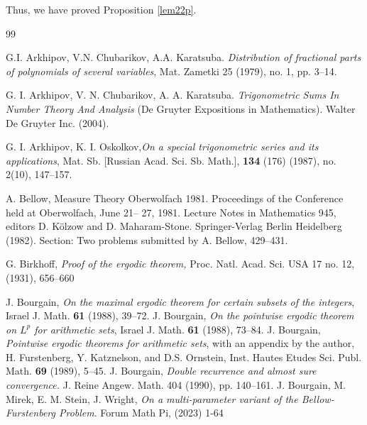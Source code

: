 \documentclass[11 pt,letterpaper]{amsart}
\theoremstyle{plain}
\theoremstyle{definition}
\theoremstyle{remark} \theoremstyle{exam} \theoremstyle{ob}
\numberwithin{equation}{section}
\begin{document}
Thus, we have proved   Proposition \ref{lem22p}.








 



 



 


 \begin{thebibliography}{99}


 G.I. Arkhipov, V.N. Chubarikov, A.A. Karatsuba. \emph{Distribution of fractional parts of polynomials of
several variables},  Mat. Zametki 25 (1979), no. 1, pp. 3–14.

 G. I. Arkhipov, V. N. Chubarikov, A. A. Karatsuba. \emph{Trigonometric Sums In Number Theory And
Analysis} (De Gruyter Expositions in Mathematics). Walter De Gruyter Inc. (2004).

  G. I. Arkhipov, K. I. Oskolkov,\emph{On a special trigonometric series and its applications},  Mat. Sb.
[Russian Acad. Sci. Sb. Math.], \textbf{134} (176) (1987), no. 2(10), 147–157.

	 A. Bellow, Measure Theory Oberwolfach 1981. Proceedings of the Conference held at Oberwolfach, June 21–
27, 1981. Lecture Notes in Mathematics 945, editors D. Kölzow and D. Maharam-Stone. Springer-Verlag Berlin
Heidelberg (1982). Section: Two problems submitted by A. Bellow, 429–431.



 

 G. Birkhoff, \emph{ Proof of the ergodic theorem,} Proc. Natl. Acad. Sci. USA 17 no. 12, (1931), 656–660

 J. Bourgain, \emph{On the maximal ergodic theorem for certain subsets of the integers}, Israel  J. Math. \textbf{61} (1988), 39--72.  
 J. Bourgain, \emph{On the pointwise ergodic theorem on $L^{p}$ for arithmetic sets}, Israel J. Math. \textbf{61}  (1988), 73--84. 
 J. Bourgain, \emph{Pointwise ergodic theorems for arithmetic sets}, with an appendix by
the author, H. Furstenberg, Y. Katznelson, and D.S. Ornstein,  Inst. Hautes Etudes Sci. Publ. Math. \textbf{69} (1989), 5--45.
 J. Bourgain, \emph{ Double recurrence and almost sure convergence.} J. Reine Angew. Math. 404 (1990), pp. 140–161.
 J. Bourgain, M. Mirek, E. M. Stein, J. Wright,  \emph{On a multi-parameter variant of the Bellow-Furstenberg Problem}.   Forum Math Pi,   (2023) 1-64
 

\end{thebibliography}
\end{document}
